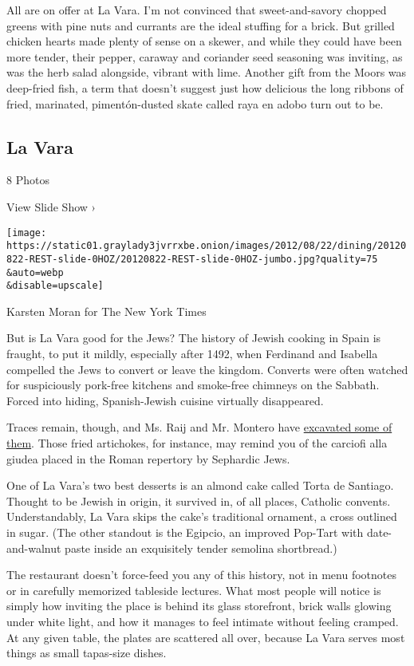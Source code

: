 All are on offer at La Vara. I'm not convinced that sweet-and-savory
chopped greens with pine nuts and currants are the ideal stuffing for a
brick. But grilled chicken hearts made plenty of sense on a skewer, and
while they could have been more tender, their pepper, caraway and
coriander seed seasoning was inviting, as was the herb salad alongside,
vibrant with lime. Another gift from the Moors was deep-fried fish, a
term that doesn't suggest just how delicious the long ribbons of fried,
marinated, pimentón-dusted skate called raya en adobo turn out to be.

\href{https://www.nytimes3xbfgragh.onion/slideshow/2012/08/22/dining/20120822-REST.html}{}

\hypertarget{la-vara}{%
\subsection{La Vara}\label{la-vara}}

8 Photos

View Slide Show ›

\texttt{[image: https://static01.graylady3jvrrxbe.onion/images/2012/08/22/dining/20120822-REST-slide-0HOZ/20120822-REST-slide-0HOZ-jumbo.jpg?quality=75\\\&auto=webp\\\&disable=upscale]}

Karsten Moran for The New York Times

But is La Vara good for the Jews? The history of Jewish cooking in Spain
is fraught, to put it mildly, especially after 1492, when Ferdinand and
Isabella compelled the Jews to convert or leave the kingdom. Converts
were often watched for suspiciously pork-free kitchens and smoke-free
chimneys on the Sabbath. Forced into hiding, Spanish-Jewish cuisine
virtually disappeared.

Traces remain, though, and Ms. Raij and Mr. Montero have
\href{http://www.tabletmag.com/jewish-life-and-religion/96987/cooking-up-spains-jewish-past}{excavated
some of them}. Those fried artichokes, for instance, may remind you of
the carciofi alla giudea placed in the Roman repertory by Sephardic
Jews.

One of La Vara's two best desserts is an almond cake called Torta de
Santiago. Thought to be Jewish in origin, it survived in, of all places,
Catholic convents. Understandably, La Vara skips the cake's traditional
ornament, a cross outlined in sugar. (The other standout is the Egipcio,
an improved Pop-Tart with date-and-walnut paste inside an exquisitely
tender semolina shortbread.)

The restaurant doesn't force-feed you any of this history, not in menu
footnotes or in carefully memorized tableside lectures. What most people
will notice is simply how inviting the place is behind its glass
storefront, brick walls glowing under white light, and how it manages to
feel intimate without feeling cramped. At any given table, the plates
are scattered all over, because La Vara serves most things as small
tapas-size dishes.

